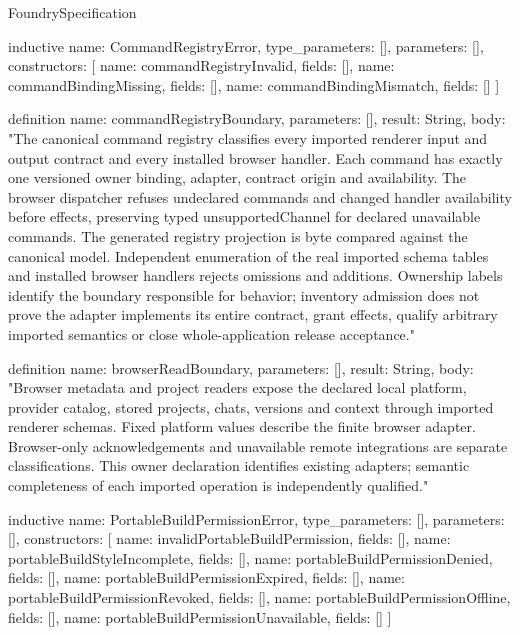\begin{lexlean}{FoundrySpecification}
\begin{semanticmodule}
inductive{
  name: CommandRegistryError,
  type_parameters: [],
  parameters: [],
  constructors: [
    {name: commandRegistryInvalid, fields: []},
    {name: commandBindingMissing, fields: []},
    {name: commandBindingMismatch, fields: []}
  ]
}

definition{
  name: commandRegistryBoundary,
  parameters: [],
  result: String,
  body: "The canonical command registry classifies every imported renderer input and output contract and every installed browser handler. Each command has exactly one versioned owner binding, adapter, contract origin and availability. The browser dispatcher refuses undeclared commands and changed handler availability before effects, preserving typed unsupportedChannel for declared unavailable commands. The generated registry projection is byte compared against the canonical model. Independent enumeration of the real imported schema tables and installed browser handlers rejects omissions and additions. Ownership labels identify the boundary responsible for behavior; inventory admission does not prove the adapter implements its entire contract, grant effects, qualify arbitrary imported semantics or close whole-application release acceptance."
}

definition{
  name: browserReadBoundary,
  parameters: [],
  result: String,
  body: "Browser metadata and project readers expose the declared local platform, provider catalog, stored projects, chats, versions and context through imported renderer schemas. Fixed platform values describe the finite browser adapter. Browser-only acknowledgements and unavailable remote integrations are separate classifications. This owner declaration identifies existing adapters; semantic completeness of each imported operation is independently qualified."
}

inductive{
  name: PortableBuildPermissionError,
  type_parameters: [],
  parameters: [],
  constructors: [
    {name: invalidPortableBuildPermission, fields: []},
    {name: portableBuildStyleIncomplete, fields: []},
    {name: portableBuildPermissionDenied, fields: []},
    {name: portableBuildPermissionExpired, fields: []},
    {name: portableBuildPermissionRevoked, fields: []},
    {name: portableBuildPermissionOffline, fields: []},
    {name: portableBuildPermissionUnavailable, fields: []}
  ]
}


\end{semanticmodule}
\end{lexlean}
